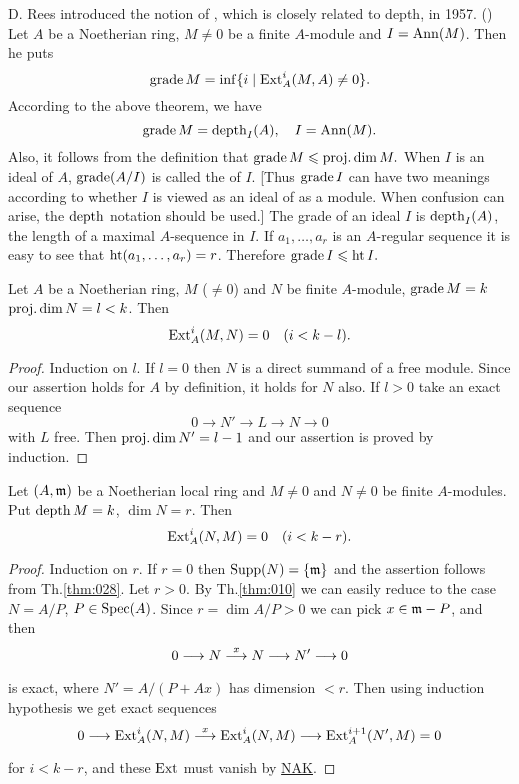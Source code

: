 \documentclass[../main]{subfiles}
\begin{document}
\newparagraph D. Rees introduced the notion of , which is closely related to depth, in 1957. (\cite{rees1957the}) Let $A$ be a Noetherian ring, $M\neq0$ be a finite $A$-module and $I=\operatorname{Ann}(M)$. Then he puts \[\operatorname{grade} M=\inf\{i \mid \operatorname{Ext}_A^i(M, A) \neq 0\}.\] According to the above theorem, we have \[\operatorname{grade} M=\operatorname{depth}_I(A), \quad I=\operatorname{Ann}(M).\] Also, it follows from the definition that $\operatorname{grade} M\leqslant\operatorname{proj. dim} M.$ When $I$ is an ideal of $A$, $\operatorname{grade}(A/I)$ is called the  of $I$. [Thus $\operatorname{grade} I$ can have two meanings according to whether $I$ is viewed as an ideal of as a module. When confusion can arise, the $\operatorname{depth}$ notation should be used.] The grade of an ideal $I$ is $\operatorname{depth}_I(A)$, the length of a maximal $A$-sequence in $I$. If $a_1,\ldots,a_r$ is an $A$-regular sequence it is easy to see that $\operatorname{ht}(a_1,\dots,a_r)=r$. Therefore $\operatorname{grade} I\leqslant\operatorname{ht} I.$

\begin{proposition}
Let $A$ be a Noetherian ring, $M$ ($\neq0$) and $N$ be finite $A$-module, $\operatorname{grade} M=k$ $\operatorname{proj. dim} N=l<k$. Then \[\Ext_A^i(M,N)=0\for{i<k-l}.\]
\end{proposition}

\begin{proof}
Induction on $l$. If $l=0$ then $N$ is a direct summand of a free module. Since our assertion holds for $A$ by definition, it holds for $N$ also. If $l > 0$ take an exact sequence \[0 \longrightarrow N' \longrightarrow L \longrightarrow N \longrightarrow 0\] with $L$ free. Then $\operatorname{proj. dim} N'=l-1$ and our assertion is proved by induction.
\end{proof}

\begin{parlemma}[Ischebeck]\label{lem:15.02}
Let $(A, \mathfrak{m})$ be a Noetherian local ring and $M \neq 0$ and $N \neq 0$ be finite $A$-modules. Put $\operatorname{depth} M=k$, $\dim N=r$. Then \[\Ext_A^i(N, M)=0\for{i<k-r}.\]
\end{parlemma} 
\begin{proof}
Induction on $r$. If $r=0$ then $\operatorname{Supp}(N)=\{\mathfrak{m}\}$ and the assertion follows from Th.\ref{thm:028}. Let $r>0$. By Th.\ref{thm:010} we can easily reduce to the case $N=A / P$, $P \in \operatorname{Spec}(A)$. Since $r=\dim A / P>0$ we can pick $x \in\mathfrak{m}-P$, and then \[0 \longrightarrow N \varrightarrow{x}N \longrightarrow N' \longrightarrow 0\] is exact, where $N'=A /(P+A x)$ has dimension $<r$. Then using induction hypothesis we get exact sequences \[0 \longrightarrow \Ext_A^i(N, M) \varrightarrow{x} \Ext_A^i(N, M) \longrightarrow \Ext_A^{i+1}(N', M)=0\] for $i<k-r$, and these $\operatorname{Ext}$ must vanish by \hyperref[NAK]{NAK}.
\end{proof}
\end{document}
